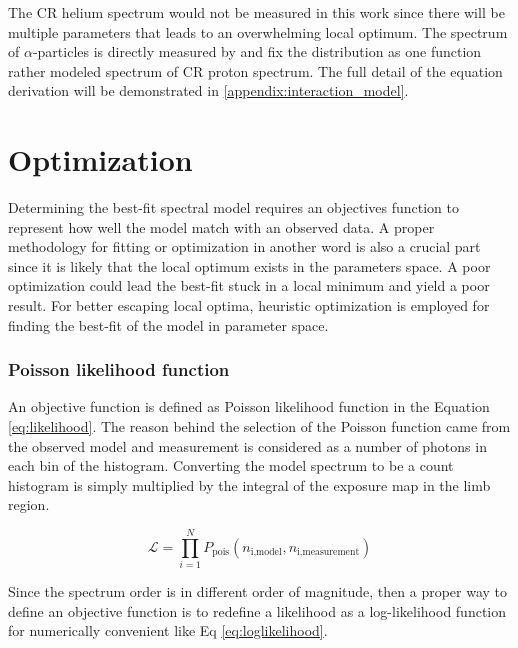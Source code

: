 The CR helium spectrum would not be measured in this work since there will be multiple parameters that leads to an overwhelming 
local optimum. The spectrum of $\alpha$-particles is directly measured 
by \cite{AMS-02Helium} and fix the distribution as one function rather 
modeled spectrum of CR proton spectrum. The full detail of the 
equation derivation will be demonstrated in \ref{appendix:interaction_model}.



\section{Optimization}
Determining the best-fit spectral model requires an objectives function
to represent how well the model match with an observed data. A proper 
methodology for fitting or optimization in another word is also 
a crucial part since it is likely that the local optimum exists in the parameters space. A poor optimization could lead the best-fit
stuck in a local minimum and yield a poor result. For better escaping 
local optima, heuristic optimization is employed for finding the 
best-fit of the model in parameter space.


\subsubsection{Poisson likelihood function}
An objective function is defined as Poisson likelihood function 
in the Equation \ref{eq:likelihood}. The reason behind the selection 
of the Poisson function came from the observed model and measurement is 
considered as a number of photons in each bin of the histogram. 
Converting the model spectrum to be a count histogram is simply
multiplied by the integral of the exposure map in the limb region.

\begin{equation}
    \mathcal{L} = \prod_{i=1}^{N} P_{\text{pois}}(n_{\text{i,model}}, n_{\text{i,measurement}})
    \label{eq:likelihood}
\end{equation}

Since the spectrum order is in different order of magnitude, then a
proper way to define an objective function is to redefine a
likelihood as a log-likelihood function for numerically
convenient like Eq \ref{eq:loglikelihood}. 

